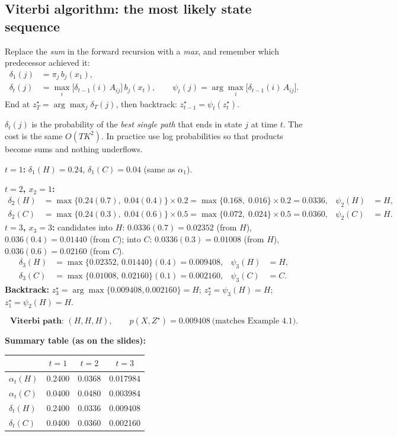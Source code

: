 \documentclass[11pt,a4paper]{article}
\begin{document}
\subsection{Viterbi algorithm: the most likely state sequence}

Replace the \emph{sum} in the forward recursion with a \emph{max}, and remember which predecessor achieved it:
\begin{align*}
\delta_1(j)&=\pi_j\,b_j(x_1),\\
\delta_t(j)&=\max_i\big[\delta_{t-1}(i)\,A_{ij}\big]\,b_j(x_t),\qquad
\psi_t(j)=\arg\max_i\big[\delta_{t-1}(i)\,A_{ij}\big].
\end{align*}
End at $z_T^\star=\arg\max_j\delta_T(j)$, then backtrack: $z_{t-1}^\star=\psi_t(z_t^\star)$.

$\delta_t(j)$ is the probability of the \emph{best single path} that ends in state $j$ at time $t$. The cost is the same $O(TK^2)$. In practice use log probabilities so that products become sums and nothing underflows.

\begin{example}[Example 5.3: Viterbi for $X=(3,1,3)$]
\textbf{$t=1$:} $\delta_1(H)=0.24$, $\delta_1(C)=0.04$ (same as $\alpha_1$).

\textbf{$t=2$, $x_2=1$:}
\begin{align*}
\delta_2(H)&=\max\{0.24(0.7),\;0.04(0.4)\}\times0.2=\max\{0.168,\;0.016\}\times0.2=0.0336,&\psi_2(H)&=H,\\
\delta_2(C)&=\max\{0.24(0.3),\;0.04(0.6)\}\times0.5=\max\{0.072,\;0.024\}\times0.5=0.0360,&\psi_2(C)&=H.
\end{align*}
\textbf{$t=3$, $x_3=3$:} candidates into $H$: $0.0336(0.7)=0.02352$ (from $H$), $0.036(0.4)=0.01440$ (from $C$); into $C$: $0.0336(0.3)=0.01008$ (from $H$), $0.036(0.6)=0.02160$ (from $C$).
\begin{align*}
\delta_3(H)&=\max\{0.02352,\,0.01440\}(0.4)=0.009408,&\psi_3(H)&=H,\\
\delta_3(C)&=\max\{0.01008,\,0.02160\}(0.1)=0.002160,&\psi_3(C)&=C.
\end{align*}
\textbf{Backtrack:} $z_3^\star=\arg\max\{0.009408,0.002160\}=H$; $z_2^\star=\psi_3(H)=H$; $z_1^\star=\psi_2(H)=H$.

\[
\textbf{Viterbi path: }(H,H,H),\qquad p(X,Z^\star)=0.009408\ \text{(matches Example 4.1)}.
\]

\textbf{Summary table (as on the slides):}
\begin{center}
\begin{tabular}{@{}lccc@{}}
\toprule
& $t=1$ & $t=2$ & $t=3$\\
\midrule
$\alpha_t(H)$ & 0.2400 & 0.0368 & 0.017984\\
$\alpha_t(C)$ & 0.0400 & 0.0480 & 0.003984\\
$\delta_t(H)$ & 0.2400 & 0.0336 & 0.009408\\
$\delta_t(C)$ & 0.0400 & 0.0360 & 0.002160\\
\bottomrule
\end{tabular}
\end{center}
\end{example}
\end{document}
